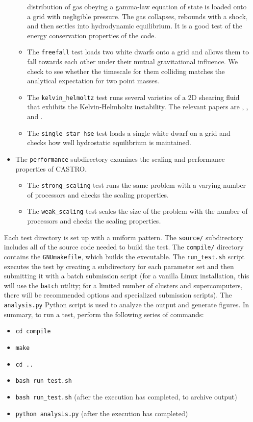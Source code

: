 \documentclass[12pt]{book}
\begin{document}
\begin{itemize}
\begin{itemize}
distribution of gas obeying a gamma-law equation of state is loaded onto a grid with negligible 
pressure. The gas collapses, rebounds with a shock, and then settles into hydrodynamic equilibrium.
It is a good test of the energy conservation properties of the code.
    \item The \texttt{freefall} test loads two white dwarfs onto a grid and allows them to fall towards
each other under their mutual gravitational influence. We check to see whether the timescale for them
colliding matches the analytical expectation for two point masses.
    \item The \texttt{kelvin\_helmoltz} test runs several varieties of a 2D shearing fluid that exhibits the 
Kelvin-Helmholtz instability. The relevant papers are \cite{robertson:2010}, \cite{arepo}, and \cite{mcnally:2012}.
    \item The \texttt{single\_star\_hse} test loads a single white dwarf on a grid and checks how well 
hydrostatic equilibrium is maintained.
  \end{itemize}
  \item The \texttt{performance} subdirectory examines the scaling and performance properties of CASTRO.
  \begin{itemize}
    \item The \texttt{strong\_scaling} test runs the same problem with a varying number of processors and 
checks the scaling properties.
    \item The \texttt{weak\_scaling} test scales the size of the problem with the number of processors and
checks the scaling properties.
  \end{itemize}
\end{itemize}

Each test directory is set up with a uniform pattern. The \texttt{source/} subdirectory includes all of the source code
needed to build the test. The \texttt{compile/} directory contains the \texttt{GNUmakefile}, which builds the executable.
The \texttt{run\_test.sh} script executes the test by creating a subdirectory
for each parameter set and then submitting it with a batch submission script (for a vanilla Linux installation,
this will use the \texttt{batch} utility; for a limited number of clusters and supercomputers, 
there will be recommended options and specialized submission scripts). The \texttt{analysis.py} Python script
is used to analyze the output and generate figures. In summary, to run a test, perform the following series of commands:
\begin{itemize}
  \item \texttt{cd compile}
  \item \texttt{make}
  \item \texttt{cd ..}
  \item \texttt{bash run\_test.sh}
  \item \texttt{bash run\_test.sh} (after the execution has completed, to archive output)
  \item \texttt{python analysis.py} (after the execution has completed)
\end{itemize}
\end{document}
